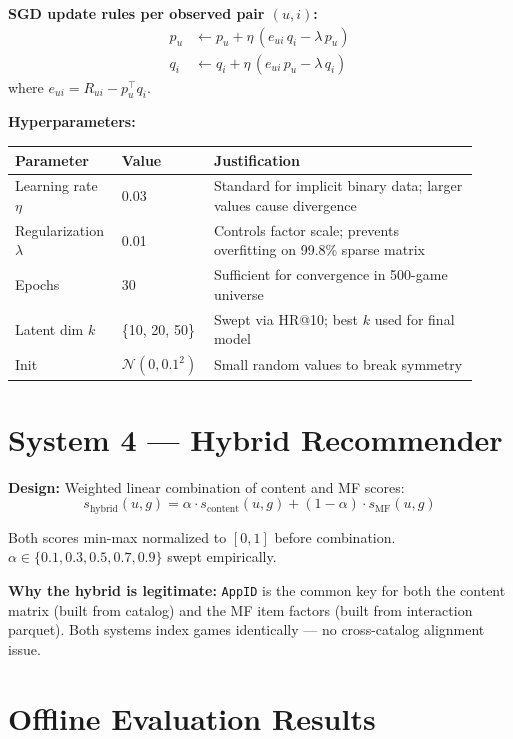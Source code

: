 \documentclass[11pt,a4paper]{article}
\begin{document}
\textbf{SGD update rules per observed pair $(u, i)$:}
\begin{align}
p_u &\leftarrow p_u + \eta\,(e_{ui}\, q_i - \lambda\, p_u) \\
q_i &\leftarrow q_i + \eta\,(e_{ui}\, p_u - \lambda\, q_i)
\end{align}
where $e_{ui} = R_{ui} - p_u^\top q_i$.

\textbf{Hyperparameters:}

\begin{longtable}{p{0.22\linewidth}p{0.15\linewidth}p{0.55\linewidth}}
\toprule
\textbf{Parameter} & \textbf{Value} & \textbf{Justification} \\
\midrule
Learning rate $\eta$ & 0.03 & Standard for implicit binary data; larger values cause divergence \\
Regularization $\lambda$ & 0.01 & Controls factor scale; prevents overfitting on 99.8\% sparse matrix \\
Epochs & 30 & Sufficient for convergence in 500-game universe \\
Latent dim $k$ & \{10, 20, 50\} & Swept via HR@10; best $k$ used for final model \\
Init & $\mathcal{N}(0, 0.1^2)$ & Small random values to break symmetry \\
\bottomrule
\end{longtable}

\section{System 4 --- Hybrid Recommender}

\textbf{Design:} Weighted linear combination of content and MF scores:
\begin{equation}
s_{\text{hybrid}}(u, g) = \alpha \cdot s_{\text{content}}(u, g) + (1-\alpha) \cdot s_{\text{MF}}(u, g)
\end{equation}

Both scores min-max normalized to $[0,1]$ before combination. $\alpha \in \{0.1, 0.3, 0.5, 0.7, 0.9\}$ swept empirically.

\textbf{Why the hybrid is legitimate:} \texttt{AppID} is the common key for both the content matrix (built from catalog) and the MF item factors (built from interaction parquet). Both systems index games identically --- no cross-catalog alignment issue.

\section{Offline Evaluation Results}
\end{document}
